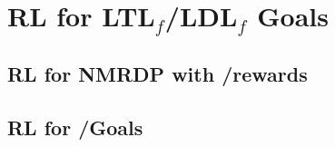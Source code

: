 \chapter{RL for {\sc LTL}$_f$/{\sc LDL}$_f$ Goals}

\section{RL for NMRDP with \LTLf/\LDLf rewards}
\section{RL for \LTLf/\LDLf Goals}
